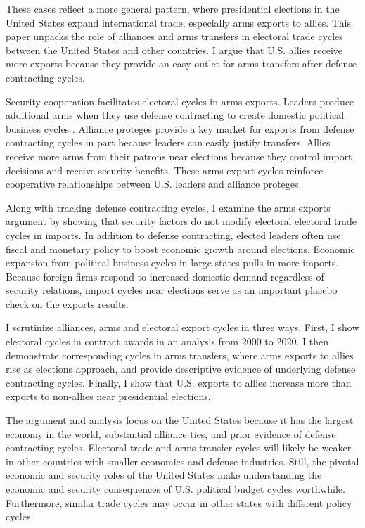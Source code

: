 \documentclass[12pt]{article}
\begin{document}
These cases reflect a more general pattern, where presidential elections in the United States expand international trade, especially arms exports to allies.
This paper unpacks the role of alliances and arms transfers in electoral trade cycles between the United States and other countries. 
I argue that U.S. allies receive more exports because they provide an easy outlet for arms transfers after defense contracting cycles. 


Security cooperation facilitates electoral cycles in arms exports. 
Leaders produce additional arms when they use defense contracting to create domestic political business cycles \citep{Tufte1978, Mintz1988, Mayer1995, DerouenHeo2000, Becker2021}.
Alliance proteges provide a key market for exports from defense contracting cycles in part because leaders can easily justify transfers.
Allies receive more arms from their patrons near elections because they control import decisions and receive security benefits. 
These arms export cycles reinforce cooperative relationships between U.S. leaders and alliance proteges.


Along with tracking defense contracting cycles, I examine the arms exports argument by showing that security factors do not modify electoral electoral trade cycles in imports.
In addition to defense contracting, elected leaders often use fiscal and monetary policy \citep{Nordhaus1975, Tufte1978, Rogoff1987, ClarkHallerberg2000} to boost economic growth around elections. 
Economic expansion from political business cycles in large states pulls in more imports.
Because foreign firms respond to increased domestic demand regardless of security relations, import cycles near elections serve as an important placebo check on the exports results.


I scrutinize alliances, arms and electoral export cycles in three ways. 
First, I show electoral cycles in contract awards in an analysis from 2000 to 2020.
I then demonstrate corresponding cycles in arms transfers, where arms exports to allies rise as elections approach, and provide descriptive evidence of underlying defense contracting cycles.
Finally, I show that U.S. exports to allies increase more than exports to non-allies near presidential elections. 


The argument and analysis focus on the United States because it has the largest economy in the world, substantial alliance ties, and prior evidence of defense contracting cycles. 
Electoral trade and arms transfer cycles will likely be weaker in other countries with smaller economies and defense industries. 
Still, the pivotal economic and security roles of the United States make understanding the economic and security consequences of U.S. political budget cycles worthwhile.
Furthermore, similar trade cycles may occur in other states with different policy cycles. 
\end{document}
